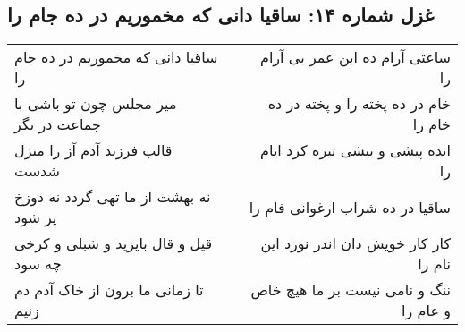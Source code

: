 \begin{center}
\section*{غزل شماره ۱۴: ساقیا دانی که مخموریم در ده جام را}
\label{sec:014}
\begin{longtable}{l p{0.5cm} r}
ساقیا دانی که مخموریم در ده جام را
&&
ساعتی آرام ده این عمر بی آرام را
\\
میر مجلس چون تو باشی با جماعت در نگر
&&
خام در ده پخته را و پخته در ده خام را
\\
قالب فرزند آدم آز را منزل شدست
&&
انده پیشی و بیشی تیره کرد ایام را
\\
نه بهشت از ما تهی گردد نه دوزخ پر شود
&&
ساقیا در ده شراب ارغوانی فام را
\\
قیل و قال بایزید و شبلی و کرخی چه سود
&&
کار کار خویش دان اندر نورد این نام را
\\
تا زمانی ما برون از خاک آدم دم زنیم
&&
ننگ و نامی نیست بر ما هیچ خاص و عام را
\\
\end{longtable}
\end{center}
